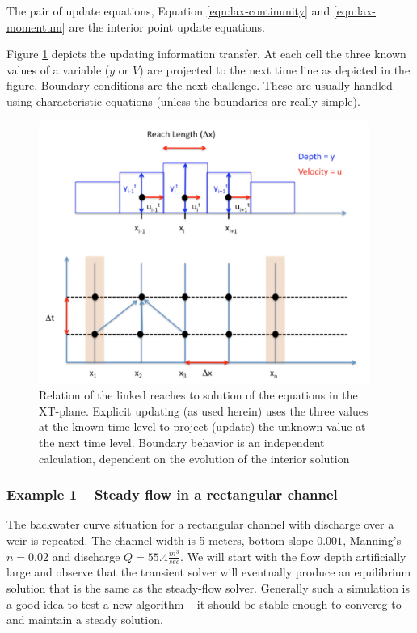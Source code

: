The pair of update equations, Equation \ref{eqn:lax-continunity} and \ref{eqn:lax-momentum} are the interior point update equations.

Figure \ref{fig:space-time-map} depicts the updating information transfer. 
At each cell the three known values of a variable ($y$ or $V$) are projected to the next time line as depicted in the figure.
Boundary conditions are the next challenge.
These are usually handled using characteristic equations (unless the boundaries are really simple).

\begin{figure}[h!] %
   \centering
   \includegraphics[width=4.25in]{./14-UnsteadyOpenChannel/space-time-map.jpg} 
   \caption{Relation of the linked reaches to solution of the equations in the XT-plane. Explicit updating (as used herein) uses the three values at the known time level to project (update) the unknown value at the next time level. 
Boundary behavior is an independent calculation, dependent on the evolution of the interior solution}
   \label{fig:space-time-map}
\end{figure}

\subsubsection{Example 1 -- Steady flow in a rectangular channel}
The backwater curve situation for a rectangular channel with discharge over a weir is repeated.  
The channel width is 5 meters, bottom slope $0.001$, Manning's $n=0.02$ and discharge $Q=55.4 \frac{m^3}{sec}$.
We will start with the flow depth artificially large and observe that the transient solver will eventually produce an equilibrium solution that is the same as the steady-flow solver.  
Generally such a simulation is a good idea to test a new algorithm -- it should be stable enough to convereg to and maintain a steady solution.

